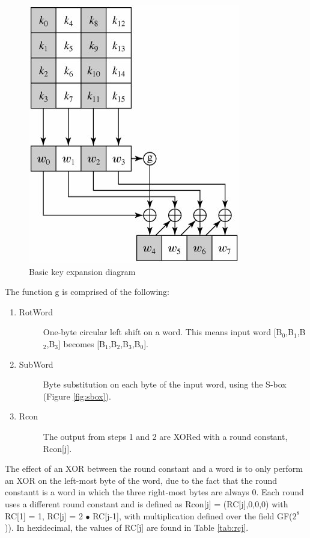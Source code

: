 \documentclass[a4paper,10pt]{report}
\begin{document}
\begin{figure}[htb]
\centering
\includegraphics[scale=0.7]{images/keyexp1.jpg}
\caption{Basic key expansion diagram}
\label{fig:keyexp1}
\end{figure}

The function g is comprised of the following:

\begin{enumerate}
 \item \begin{description}
  \item[RotWord] One-byte circular left shift on a word. This means input word [B$_{0}$,B$_{1}$,B$_{2}$,B$_{3}$] becomes [B$_{1}$,B$_{2}$,B$_{3}$,B$_{0}$].
 \end{description}
 \item \begin{description}
  \item[SubWord] Byte substitution on each byte of the input word, using the S-box (Figure \ref{fig:sbox}).
 \end{description}
 \item \begin{description}
  \item[Rcon] The output from steps 1 and 2 are XORed with a round constant, Rcon[j]. 
 \end{description}
\end{enumerate}

The effect of an XOR between the round constant and a word is to only perform an XOR on the left-most byte of the word, due to the fact that the round constantt is a word in which the three right-most bytes are always 0. Each round uses a different round constant and is defined as Rcon[j] = (RC[j],0,0,0) with RC[1] = 1, RC[j] = 2 $\bullet$ RC[j-1], with multiplication defined over the field GF($2^{8}$)). In hexidecimal, the values of RC[j] are found in Table \ref{tab:rcj}.
\end{document}

